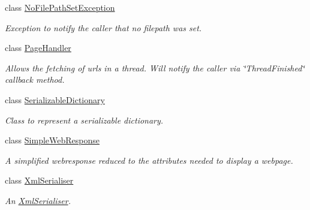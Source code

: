 \begin{DoxyCompactItemize}
class \hyperlink{class_assessment___two___logic_1_1_model_1_1_no_file_path_set_exception}{NoFilePathSetException}
\begin{DoxyCompactList}\small\item\em Exception to notify the caller that no filepath was set. \item\end{DoxyCompactList}\item 
class \hyperlink{class_assessment___two___logic_1_1_model_1_1_page_handler}{PageHandler}
\begin{DoxyCompactList}\small\item\em Allows the fetching of urls in a thread. Will notify the caller via \char`\"{}ThreadFinished\char`\"{} callback method. \item\end{DoxyCompactList}\item 
class \hyperlink{class_assessment___two___logic_1_1_model_1_1_serializable_dictionary-g}{SerializableDictionary}
\begin{DoxyCompactList}\small\item\em Class to represent a serializable dictionary. \item\end{DoxyCompactList}\item 
class \hyperlink{class_assessment___two___logic_1_1_model_1_1_simple_web_response}{SimpleWebResponse}
\begin{DoxyCompactList}\small\item\em A simplified webresponse reduced to the attributes needed to display a webpage. \item\end{DoxyCompactList}\item 
class \hyperlink{class_assessment___two___logic_1_1_model_1_1_xml_serialiser-g}{XmlSerialiser}
\begin{DoxyCompactList}\small\item\em An \hyperlink{class_assessment___two___logic_1_1_model_1_1_xml_serialiser-g}{XmlSerialiser}. \item\end{DoxyCompactList}\end{DoxyCompactItemize}

